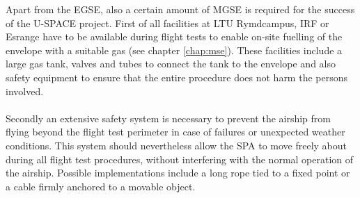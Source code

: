Apart from the \ac{EGSE}, also a certain amount of \ac{MGSE} is required for the success of the \ac{U-SPACE} project. First of all facilities at \ac{LTU} Rymdcampus, \ac{IRF} or Esrange have to be available during flight tests to enable on-site fuelling of the envelope with a suitable gas (see chapter \ref{chap:mse}). These facilities include a large gas tank, valves and tubes to connect the tank to the envelope and also safety equipment to ensure that the entire procedure does not harm the persons involved.
\\
\\
Secondly an extensive safety system is necessary to prevent the airship from flying beyond the flight test perimeter in case of failures or unexpected weather conditions. This system should nevertheless allow the \ac{SPA} to move freely about during all flight test procedures, without interfering with the normal operation of the airship. Possible implementations include a long rope tied to a fixed point or a cable firmly anchored to a movable object.
